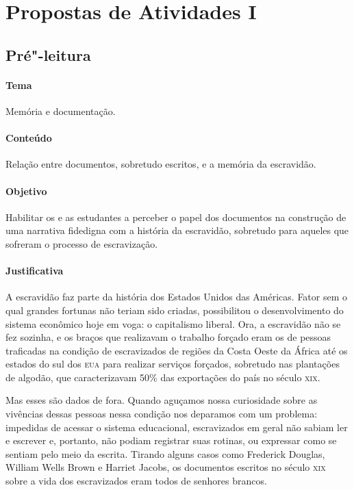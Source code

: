 \documentclass[11pt]{extarticle}
\begin{document}
\tableofcontents

\section{Propostas de Atividades I}




\subsection{Pré"-leitura}

\paragraph{Tema} Memória e documentação.

\paragraph{Conteúdo} Relação entre documentos, sobretudo escritos, e a memória da escravidão.

\paragraph{Objetivo} Habilitar os e as estudantes a perceber o papel dos documentos na 
construção de uma narrativa fidedigna com a história da escravidão, sobretudo para aqueles
que sofreram o processo de escravização.

\paragraph{Justificativa} A escravidão faz parte da história dos Estados Unidos das Américas.
Fator sem o qual grandes fortunas não teriam sido criadas, possibilitou o desenvolvimento
do sistema econômico hoje em voga: o capitalismo liberal. Ora, a escravidão não se fez sozinha, 
e os braços que realizavam o trabalho forçado eram os de pessoas traficadas na condição de escravizados
de regiões da Costa Oeste da África até os estados do sul dos \textsc{eua} para realizar serviços forçados,
sobretudo nas plantações de algodão, que caracterizavam 50\% das exportações do país no século \textsc{xix}. 

Mas esses são dados de fora. Quando aguçamos nossa curiosidade sobre as vivências dessas pessoas
nessa  condição nos deparamos com um problema: impedidas de acessar o sistema educacional,
escravizados em geral não sabiam ler e escrever e, portanto, não podiam registrar suas rotinas,
ou expressar como se sentiam pelo meio da escrita. Tirando alguns casos como Frederick Douglas,
William Wells Brown e Harriet Jacobs, os documentos escritos no século \textsc{xix} sobre a vida dos escravizados
eram todos de senhores brancos. 
\end{document}
